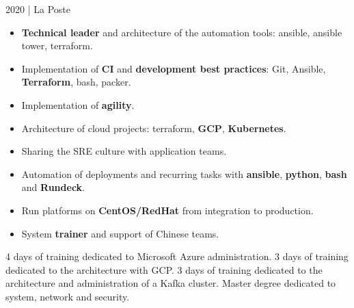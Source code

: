 \documentclass[
	a4paper,
	maincolor=cvartifakt,
	sidecolor=cvgray,
	sidebartextcolor=cvwhite,
	sectioncolor=cvartifakt,
	subsectioncolor=cvgray,
	sidebarwidth=0.36\paperwidth,
    topbottommargin=0.04\paperheight,
]{fortysecondscv}
\begin{document}
\begin{cvtable}[2]
{\begin{itemize}
			\end{itemize}
	}
	{
		\textcolor{maincolor}{2020 | La Poste}
		\begin{itemize}
			\item \textbf{Technical leader} and architecture of the automation tools: ansible, ansible tower, terraform.
			\item Implementation of \textbf{CI} and \textbf{development best practices}: Git, Ansible, \textbf{Terraform}, bash, packer.
			\item Implementation of \textbf{agility}.
		\end{itemize}
	}
	{
		\begin{itemize}
			\item Architecture of cloud projects: terraform, \textbf{GCP}, \textbf{Kubernetes}.
			\item Sharing the SRE culture with application teams.
			\item Automation of deployments and recurring tasks with \textbf{ansible}, \textbf{python}, \textbf{bash} and \textbf{Rundeck}.
			\item Run platforms on \textbf{CentOS/RedHat} from integration to production.
			\item System \textbf{trainer} and support of Chinese teams.
		\end{itemize}
	}
\end{cvtable}

\begin{cvtable}[2]
		{4 days of training dedicated to Microsoft Azure administration.}
		{3 days of training dedicated to the architecture with GCP.}
		{3 days of training dedicated to the architecture and administration of a Kafka cluster.}
		{Master degree dedicated to system, network and security.}
\end{cvtable}

\vspace{-11pt}
\end{document}
